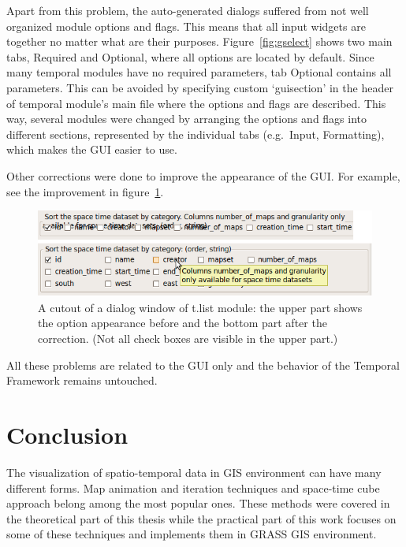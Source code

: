 \documentclass[a4paper,12pt,oneside]{book}
\newcommand{\module}[1]{\textsl{#1}}
\newcommand{\tf}{Temporal Framework\xspace}
\begin{document}
Apart from this problem, the auto-generated dialogs suffered from
not well organized module options and flags. This means that all input widgets
are together no matter what are their purposes.
Figure~\ref{fig:gselect} shows two main tabs, Required and Optional,
where all options are located by default.
Since many temporal modules have no required parameters, tab Optional
contains all parameters. This can be avoided by specifying
custom `guisection' in the header of temporal module's main file
where the options and flags are described. This way, several modules
were changed by arranging the options and flags into different sections, represented
by the individual tabs (e.g.\ Input, Formatting), which makes the
GUI easier to use.

Other corrections were done to improve the appearance of the GUI. For example,
see the improvement in figure~\ref{fig:forms}.
\begin{figure}[h!]
  \centering
  \includegraphics{./images/forms.png}
  \caption[A cutout of \module{t.list} dialog window]
  {A cutout of a dialog window of t.list module:
  the upper part shows the option appearance before and the bottom part after the correction.
  (Not all check boxes are visible in the upper part.)}
  \label{fig:forms}
\end{figure}

All these problems are related to the GUI only and the behavior of the \tf
remains untouched.

\cleardoublepage

\chapter*{Conclusion}

The visualization of spatio-temporal data in GIS environment can have many different forms.
Map animation and iteration techniques and space-time cube approach belong among the most popular ones.
These methods were covered in the theoretical part of this thesis
while the practical part of this work focuses on some of these techniques
and implements them in GRASS GIS environment.
\end{document}
